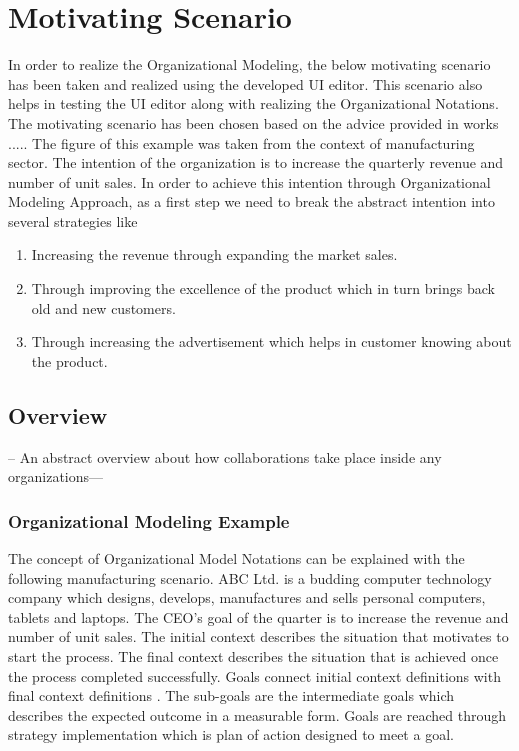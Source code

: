 \chapter{Motivating Scenario}
\label{chap:motivatingScenario}

In order to realize the Organizational Modeling, the below motivating scenario has been taken and realized using the developed UI editor.
This scenario also helps in testing the UI editor along with realizing the Organizational Notations. The motivating scenario has been chosen based on the advice provided in works ..... The figure of this example was taken from the context of manufacturing sector. The  intention of the organization is to increase the quarterly revenue and number of unit sales. In order to achieve this intention through Organizational Modeling Approach, as a first step we need to break the abstract intention into several strategies like
\begin{enumerate}
	\item Increasing the revenue through expanding the market sales. 
	\item Through improving the excellence of the product which in turn brings back old and new customers.
	\item Through increasing the advertisement which helps in customer knowing about the product.
\end{enumerate}

\section{Overview}
\label{sec:overview}
-- An abstract overview about how collaborations take place inside any organizations---
 





\subsection{Organizational Modeling Example}
 The concept of Organizational Model Notations can be explained with the following manufacturing scenario. ABC Ltd. is a budding computer technology company which designs, develops, manufactures and sells personal computers, tablets and laptops. The CEO's goal of the quarter is to increase the revenue and number of unit sales. The initial context describes the situation that motivates to start the process. The final context describes the situation that is achieved once the process completed successfully. Goals connect initial context definitions with final context definitions \cite{Sungur2014a}. The sub-goals are the intermediate goals which describes the expected outcome in a measurable form. Goals are reached through strategy implementation which is plan of action designed to meet a goal. 

